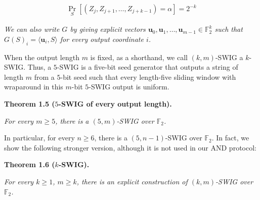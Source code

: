 \documentclass[10pt,a4paper]{article}
\begin{document}
\[\begin{gathered}
\Pr_{S}[(Z_{j},Z_{j+1},\ldots,Z_{j+k-1})=\alpha]=2^{-k}
\end{gathered}\]


\emph{We can also write $G$ by giving explicit vectors $\mathbf{u}_{0},\mathbf{u}_{1},\ldots,\mathbf{u}_{m-1}\in\mathbb{F}_{2}^{k}$ such that
$G(S)_{i}=\langle\mathbf{u}_{i},S\rangle$
for every output coordinate $i$.}\par






When the output length $m$ is fixed, as a shorthand, we call $(k,m)$-SWIG a
$k$-SWIG. Thus, a $5$-SWIG is a five-bit seed generator that outputs a string of length $m$ from a $5$-bit seed such that every length-five sliding window with wraparound in this $m$-bit $5$-SWIG output is uniform.\par





\par\medskip\noindent\textbf{
\textbf{Theorem 1.5}\textbf{ }($5$-SWIG of every output length)\textbf{.}
}\par



\emph{For every $m\geq 5$, there is a $(5,m)$-SWIG over $\mathbb{F}_{2}$.}\par






In particular, for every $n\geq 6$, there is a $(5,n-1)$-SWIG over $\mathbb{F}_{2}$. In fact,
we show the following stronger version, although it is not used in our AND protocol:\par





\par\medskip\noindent\textbf{
\textbf{Theorem 1.6}\textbf{ }($k$-SWIG)\textbf{.}
}\par



\emph{For every $k\geq 1$, $m\geq k$, there is an explicit construction of $(k,m)$-SWIG over $\mathbb{F}_{2}$.}\par
\end{document}
